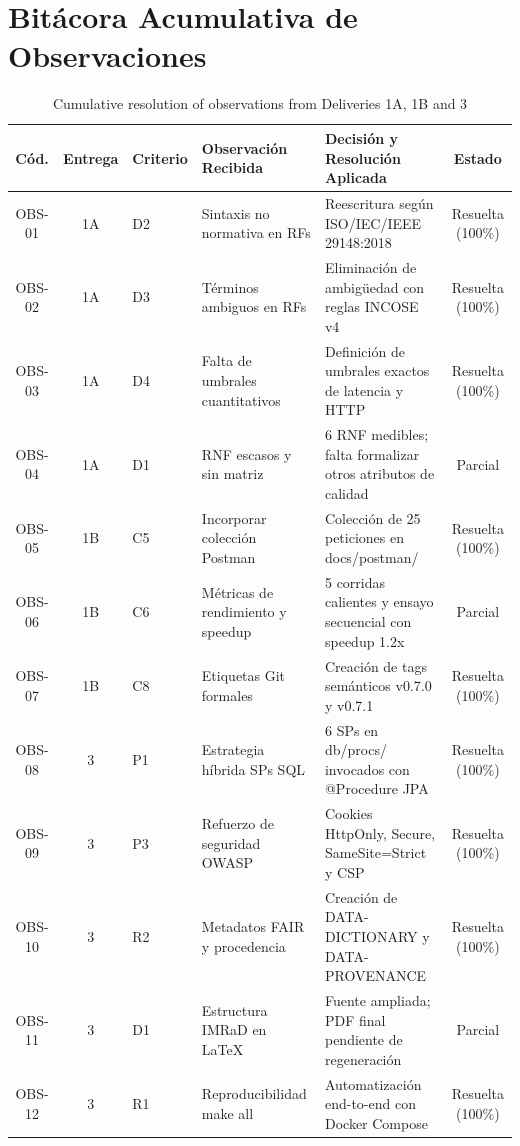 \documentclass[11pt,a4paper]{report}
\begin{document}
\appendix
\chapter{Bitácora Acumulativa de Observaciones}
\begin{table}[htbp]
\centering
\caption{Cumulative resolution of observations from Deliveries 1A, 1B and 3}
\label{tab:anexo_observaciones}
\tiny
\begin{tabularx}{\textwidth}{ccllXc}
\toprule
\textbf{Cód.} & \textbf{Entrega} & \textbf{Criterio} & \textbf{Observación Recibida} & \textbf{Decisión y Resolución Aplicada} & \textbf{Estado} \\
\midrule
OBS-01 & 1A & D2 & Sintaxis no normativa en RFs & Reescritura según ISO/IEC/IEEE 29148:2018 & Resuelta (100\%) \\
OBS-02 & 1A & D3 & Términos ambiguos en RFs & Eliminación de ambigüedad con reglas INCOSE v4 & Resuelta (100\%) \\
OBS-03 & 1A & D4 & Falta de umbrales cuantitativos & Definición de umbrales exactos de latencia y HTTP & Resuelta (100\%) \\
OBS-04 & 1A & D1 & RNF escasos y sin matriz & 6 RNF medibles; falta formalizar otros atributos de calidad & Parcial \\
OBS-05 & 1B & C5 & Incorporar colección Postman & Colección de 25 peticiones en docs/postman/ & Resuelta (100\%) \\
OBS-06 & 1B & C6 & Métricas de rendimiento y speedup & 5 corridas calientes y ensayo secuencial con speedup 1.2x & Parcial \\
OBS-07 & 1B & C8 & Etiquetas Git formales & Creación de tags semánticos v0.7.0 y v0.7.1 & Resuelta (100\%) \\
OBS-08 & 3 & P1 & Estrategia híbrida SPs SQL & 6 SPs en db/procs/ invocados con @Procedure JPA & Resuelta (100\%) \\
OBS-09 & 3 & P3 & Refuerzo de seguridad OWASP & Cookies HttpOnly, Secure, SameSite=Strict y CSP & Resuelta (100\%) \\
OBS-10 & 3 & R2 & Metadatos FAIR y procedencia & Creación de DATA-DICTIONARY y DATA-PROVENANCE & Resuelta (100\%) \\
OBS-11 & 3 & D1 & Estructura IMRaD en LaTeX & Fuente ampliada; PDF final pendiente de regeneración & Parcial \\
OBS-12 & 3 & R1 & Reproducibilidad make all & Automatización end-to-end con Docker Compose & Resuelta (100\%) \\
\bottomrule
\end{tabularx}
\end{table}
\end{document}

